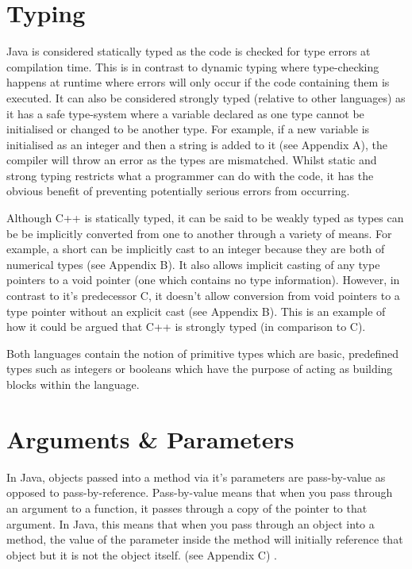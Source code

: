 \documentclass[]{report}
\begin{document}
\section{Typing}
Java is considered statically typed as the code is checked for type errors at compilation time. This is in contrast to dynamic typing where type-checking happens at runtime where errors will only occur if the code containing them is executed. It can also be considered strongly typed (relative to other languages) as it has a safe type-system where a variable declared as one type cannot be initialised or changed to be another type. For example, if a new variable is initialised as an integer and then a string is added to it (see Appendix A), the compiler will throw an error as the types are mismatched. Whilst static and strong typing restricts what a programmer can do with the code, it has the obvious benefit of preventing potentially serious errors from occurring.\cite{Typing}	

Although C++ is statically typed, it can be said to be weakly typed as types can be be implicitly converted from one to another through a variety of means. For example, a short can be implicitly cast to an integer because they are both of numerical types (see Appendix B). It also allows implicit casting of any type pointers to a void pointer (one which contains no type information). However, in contrast to it's predecessor C, it doesn't allow conversion from void pointers to a type pointer without an explicit cast (see Appendix B). This is an example of how it could be argued that C++ is strongly typed (in comparison to C). \cite{Typing}

Both languages contain the notion of primitive types which are basic, predefined types such as integers or booleans which have the purpose of acting as building blocks within the language.

\section{Arguments \& Parameters}
In Java, objects passed into a method via it's parameters are pass-by-value as opposed to pass-by-reference. Pass-by-value means that when you pass through an argument to a function, it passes through a copy of the pointer to that argument. In Java, this means that when you pass through an object into a method, the value of the parameter inside the method will initially reference that object but it is not the object itself. (see Appendix C) \cite{ParametersJava}.
\end{document}
